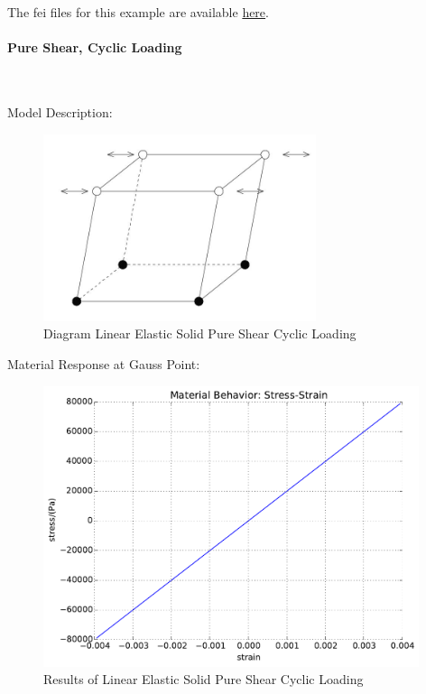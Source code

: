 \documentclass[fleqn,11pt]{article}
\begin{document}
The fei files for this example are available \href{https://github.com/yuan-energy/education_examples/tree/master/fei_examples/linear_elastic_solid/1pure_shear_mono_loading}{here}.

\newpage
\paragraph{Pure Shear, Cyclic Loading} ~

Model Description:

\begin{figure}[H]
\begin{center}
\includegraphics[width=8cm]{../Figure-files/shear_cyclic_brick.JPG}
\caption{
\label{Solid Linear Elastic Solid Pure Shear Cyclic Loadin}
Diagram Linear Elastic Solid Pure Shear Cyclic Loading}
\end{center}
\end{figure}

Material Response at Gauss Point:
\begin{figure}[H]
\begin{center}
\includegraphics[width=11cm]{../fei_examples/linear_elastic_solid/2pure_shear_cyclic_loading/result.pdf}
\caption{
\label{Results Linear Elastic Solid Pure Shear Cyclic Loadin}
Results of Linear Elastic Solid Pure Shear Cyclic Loading}
\end{center}
\end{figure}
\end{document}
